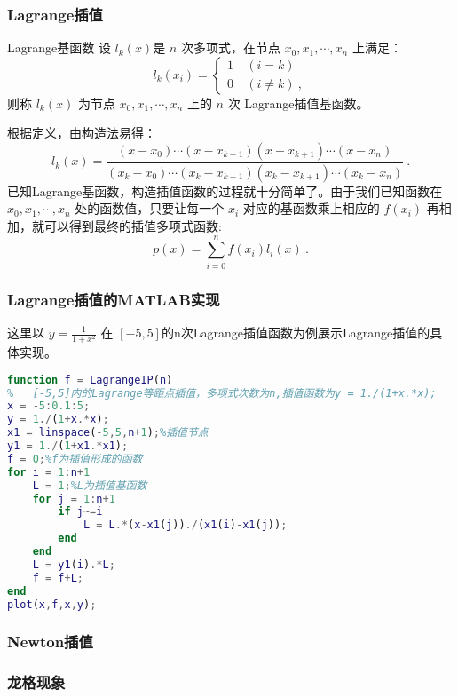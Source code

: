 \subsubsection{Lagrange插值}
\begin{definition}{Lagrange基函数}
设 $l_k(x)$是 $n$ 次多项式，在节点 $x_0, x_1,\cdots,x_n$ 上满足：
\begin{equation}
l_k(x_i) = 
\begin{cases}
1\ &(i = k)\\
0 \ &(i \neq k)~,
\end{cases}
\end{equation}
则称 $l_k(x)$ 为节点 $x_0,x_1,\cdots,x_n$ 上的 $n$ 次 Lagrange插值基函数。
\end{definition}
根据定义，由构造法易得：
\begin{equation}
l_k(x) = \frac{(x-x_0)\cdots(x-x_{k-1})(x-x_{k+1})\cdots (x-x_n)}{(x_k-x_0)\cdots(x_k-x_{k-1})(x_k-x_{k+1})\cdots(x_k-x_n)}~.
\end{equation}
已知Lagrange基函数，构造插值函数的过程就十分简单了。由于我们已知函数在 $x_0,x_1,\cdots,x_n$ 处的函数值，只要让每一个 $x_i$ 对应的基函数乘上相应的 $f(x_i)$ 再相加，就可以得到最终的插值多项式函数:
\begin{equation}
p(x) = \sum_{i = 0}^n f(x_i)l_i(x) ~.
\end{equation}
\subsubsection{Lagrange插值的MATLAB实现}
这里以 $y = \frac{1}{1+x^2}$ 在 $[-5,5]$的n次Lagrange插值函数为例展示Lagrange插值的具体实现。
\begin{lstlisting}[language=matlab]
function f = LagrangeIP(n)
%   [-5,5]内的Lagrange等距点插值，多项式次数为n,插值函数为y = 1./(1+x.*x);
x = -5:0.1:5;
y = 1./(1+x.*x);
x1 = linspace(-5,5,n+1);%插值节点
y1 = 1./(1+x1.*x1);
f = 0;%f为插值形成的函数
for i = 1:n+1
    L = 1;%L为插值基函数
    for j = 1:n+1
        if j~=i
            L = L.*(x-x1(j))./(x1(i)-x1(j));
        end
    end
    L = y1(i).*L;
    f = f+L;
end
plot(x,f,x,y);
\end{lstlisting}
\subsubsection{Newton插值}

\subsubsection{龙格现象}


